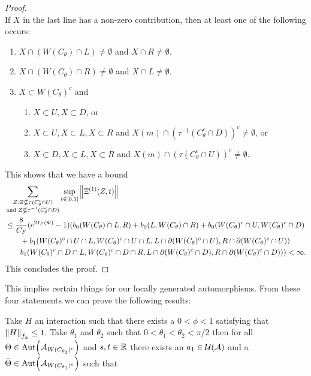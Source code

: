 \documentclass[11pt,a4paper,twoside]{article}
\numberwithin{equation}{section}
\begin{document}
{\begin{proof}
\begin{equation}
		\end{equation}
		If $X$ in the last line has a non-zero contribution, then at least one of the following occurs:
		\begin{enumerate}
			\item $X\cap (W(C_\theta)\cap L)\neq\emptyset$ and $X\cap R\neq\emptyset$.
			\item $X\cap (W(C_\theta)\cap R)\neq\emptyset$ and $X\cap L\neq\emptyset$.
			\item $X\subset W(C_\theta)^c$ and
			\begin{enumerate}
				\item $X\subset U,X\subset D$, or
				\item $X\subset U,X\subset L,X\subset R$ and $X(m)\cap (\tau^{-1}(C_\theta^c\cap D))^c\neq \emptyset$, or
				\item $X\subset D,X\subset L,X\subset R$ and $X(m)\cap (\tau(C_\theta^c\cap U))^c\neq \emptyset$.
			\end{enumerate}
		\end{enumerate}
		This shows that we have a bound
		\begin{align}
			&\sum_{\substack{Z:Z\nsubseteq \tau(C_\theta^c\cap U)\\\text{and }Z\nsubseteq \tau^{-1}(C_\theta^c\cap D)}}\sup_{t\in[0,1]}\norm{\Xi^{(1)}(Z,t)}\\
			\nonumber
			&\leq \frac{8}{C_F}(e^{2I_F(\Psi)}-1)(b_0(W(C_\theta)\cap L,R)+b_0(L,W(C_\theta)\cap R)+b_0(W(C_\theta)^c\cap U,W(C_\theta)^c\cap D)\\
			\nonumber
			&\qquad+b_1(W(C_\theta)^c\cap U\cap L,W(C_\theta)^c\cap U\cap L,L\cap\partial(W(C_\theta)^c\cap U),R\cap\partial(W(C_\theta)^c\cap U))\\
			&\qquad b_1(W(C_\theta)^c\cap D\cap L,W(C_\theta)^c\cap D\cap R,L\cap\partial(W(C_\theta)^c\cap D),R\cap\partial(W(C_\theta)^c\cap D)))<\infty.
		\end{align}
		This concludes the proof.
	\end{proof}
	This implies certain things for our locally generated automorphisms. From these four statements we can prove the following results:
	\begin{lemma}\label{lem:TwoAngleLemmaPart1}
		Take $H$ an interaction such that there exists a $0<\phi<1$ satisfying that $\norm{H}_{f_\phi}\leq 1$. Take $\theta_1$ and $\theta_2$ such that $0<\theta_1<\theta_2<\pi/2$ then for all $\Theta\in\Aut{\AA_{W(C_{\theta_2})^c}}$ and $s,t\in\mathbb R$ there exists an $a_1\in\mathcal U(\mathcal A)$ and a $\tilde{\Theta}\in \Aut{\AA_{W(C_{\theta_1})^c}}$ such that

\end{lemma}}
\end{document}

